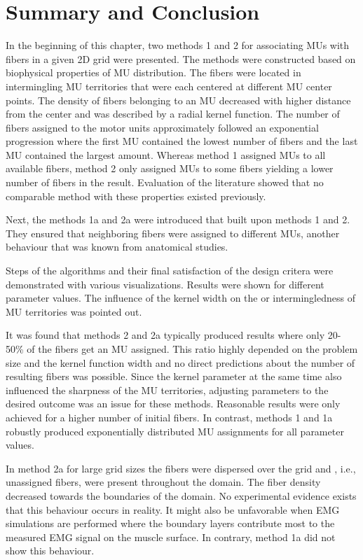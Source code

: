 \section{Summary and Conclusion}\label{sec:mu_conclusion}
In the beginning of this chapter, two methods 1 and 2 for associating MUs with fibers in a given 2D grid were presented. The methods were constructed based on biophysical properties of MU distribution. The fibers were located in intermingling MU territories that were each centered at different MU center points.
The density of fibers belonging to an MU decreased with higher distance from the center and was described by a radial kernel function.
The number of fibers assigned to the motor units approximately followed an exponential progression where the first MU contained the lowest number of fibers and the last MU contained the largest amount. 
Whereas method 1 assigned MUs to all available fibers, method 2 only assigned MUs to some fibers yielding a lower number of fibers in the result.
Evaluation of the literature showed that no comparable method with these properties existed previously.

Next, the methods 1a and 2a were introduced that built upon methods 1 and 2. They ensured that neighboring fibers were assigned to different MUs, another behaviour that was known from anatomical studies.

Steps of the algorithms and their final satisfaction of the design critera were demonstrated with various visualizations. Results were shown for different parameter values. The influence of the kernel width on the  or intermingledness of MU territories was pointed out. 

It was found that methods 2 and 2a typically produced results where only 20-50\% of the fibers get an MU assigned. This ratio highly depended on the problem size and the kernel function width and no direct predictions about the number of resulting fibers was possible. Since the kernel parameter at the same time also influenced the sharpness of the MU territories, adjusting parameters to the desired outcome was an issue for these methods. Reasonable results were only achieved for a higher number of initial fibers. In contrast, methods 1 and 1a robustly produced exponentially distributed MU assignments for all parameter values.

In method 2a for large grid sizes the fibers were dispersed over the grid and , i.e., unassigned fibers, were present throughout the domain. The fiber density decreased towards the boundaries of the domain. No experimental evidence exists that this behaviour occurs in reality. It might also be unfavorable when EMG simulations are performed where the boundary layers contribute most to the measured EMG signal on the muscle surface. In contrary, method 1a did not show this behaviour.

